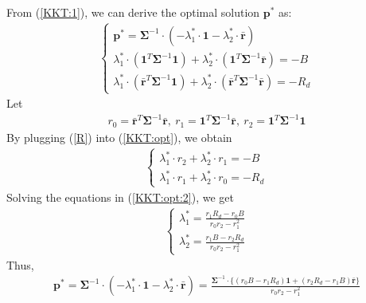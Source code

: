 \documentclass[12pt]{ftec2101}
\newcommand{\vect}[1]{\mathbf{#1}}
\begin{document}
From (\ref{KKT:1}), we can derive the optimal solution $\vect{p}^{*}$ as:
\begin{align}
    \begin{cases}
        \boldsymbol{p^{*}} = \boldsymbol{\Sigma}^{-1} \cdot (-\lambda_{1}^{*} \cdot \boldsymbol{1} - \lambda_{2}^{*}\cdot \boldsymbol{\bar{r}}) \\
        \lambda_{1}^{*} \cdot (\boldsymbol{1}^{T} \boldsymbol{\Sigma}^{-1} \boldsymbol{1}) + \lambda_{2}^{*} \cdot (\boldsymbol{1}^{T} \boldsymbol{\Sigma}^{-1} \boldsymbol{\bar{r}})=-B \\
        \lambda_{1}^{*} \cdot (\boldsymbol{\bar{r}}^{T} \boldsymbol{\Sigma}^{-1} \boldsymbol{1}) + \lambda_{2}^{*} \cdot (\boldsymbol{\bar{r}}^{T} \boldsymbol{\Sigma}^{-1} \boldsymbol{\bar{r}}) =-R_{d}
    \end{cases}
    \label{KKT:opt}
\end{align} 
Let
\begin{align}
    r_{0}=\boldsymbol{\bar{r}}^{T} \boldsymbol{\Sigma}^{-1} \boldsymbol{\bar{r}},~
    r_{1}=\boldsymbol{1}^{T} \boldsymbol{\Sigma}^{-1} \boldsymbol{\bar{r}},~
    r_{2}=\boldsymbol{1}^{T} \boldsymbol{\Sigma}^{-1} \boldsymbol{1}
    \label{R}
\end{align}
By plugging (\ref{R}) into (\ref{KKT:opt}), we obtain
\begin{align}
    \begin{cases}
        \lambda_{1}^{*} \cdot r_{2} + \lambda_{2}^{*} \cdot r_{1}=-B \\
        \lambda_{1}^{*} \cdot r_{1} + \lambda_{2}^{*} \cdot r_{0}=-R_{d}
    \end{cases}
    \label{KKT:opt:2}
\end{align}
Solving the equations in (\ref{KKT:opt:2}), we get  
\begin{align}
    \begin{cases}
        \lambda_1^* = \frac{r_1 R_d- r_0 B}{r_0 r_2 -r_1^2} \\
        \lambda_2^* = \frac{r_1 B - r_2 R_d}{r_0 r_2 -r_1^2}
    \end{cases}
\end{align}
Thus,
\begin{align}
    \vect{p}^* = \boldsymbol{\Sigma}^{-1} \cdot (-\lambda_{1}^{*} \cdot \boldsymbol{1} - \lambda_{2}^{*}\cdot \boldsymbol{\bar{r}}) =
    \frac{\boldsymbol{\Sigma}^{-1} \cdot \big \{  (r_{0}B-r_{1}R_{d})\boldsymbol{1} + (r_{2}R_{d}-r_{1}B)\boldsymbol{\bar{r}}   \big \}}{r_{0}r_{2}-r_{1}^{2}}
\end{align}
\end{document}
